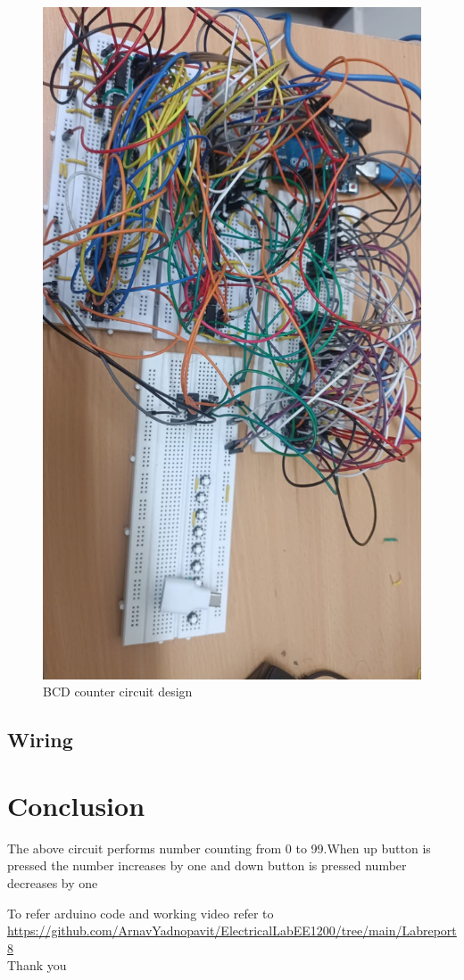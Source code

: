 \documentclass{article}
\begin{document}
    \begin{figure}[H]
	    \centering
	    \includegraphics[width=\textwidth]{circuit.jpeg}
	    \caption{BCD counter circuit design}
	    \label{fig(b):BCD_Counter_design}
    \end{figure}
    \newpage
    \subsection{Wiring}
    
    \section{Conclusion}
    The above circuit performs number counting from 0 to 99.When up button is pressed the number increases by one and down button is pressed number decreases by one
    
    To refer arduino code and working video refer to \\
    \url{https://github.com/ArnavYadnopavit/ElectricalLabEE1200/tree/main/Labreport8}\\
    
 \centering
 Thank you
    
\end{document}
